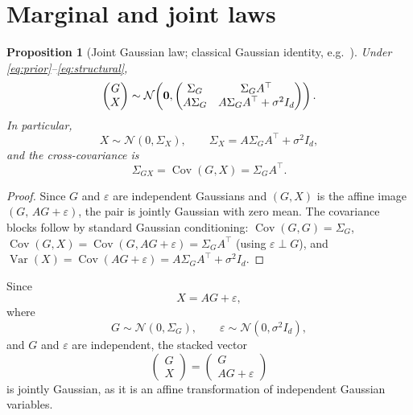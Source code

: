 \documentclass{article}
\newtheorem{proposition}{Proposition}
\newcommand{\N}{\mathcal{N}}
\newcommand{\Cov}{\operatorname{Cov}}
\newcommand{\Var}{\operatorname{Var}}
\newcommand{\Sg}{\Sigma_{G}}
\newcommand{\Sx}{\Sigma_{X}}
\newcommand{\Sgx}{\Sigma_{GX}}
\newcommand{\T}{^{\top}}
\begin{document}
\section{Marginal and joint laws}
\label{sec:joint}


\begin{proposition}[Joint Gaussian law; classical Gaussian identity, e.g.\ \citealp{cover2006elements}]
\label{prop:joint}
Under \eqref{eq:prior}--\eqref{eq:structural},
\begin{equation}
\begin{pmatrix}
G\\
X
\end{pmatrix}
\sim
\N\!\left(
\bf{0},
\begin{pmatrix}
\Sg & \Sg A^\top\\
A\Sg & A\Sg A^\top + \sigma^2 I_d
\end{pmatrix}
\right).
\end{equation}
In particular,
\begin{equation}
X \sim \N(0,\Sx),
\qquad
\Sx = A\Sg A^\top + \sigma^2 I_d,
\label{eq:sigmax}
\end{equation}
and the cross-covariance is
\begin{equation}
\Sgx = \Cov(G,X)=\Sg A^\top.
\end{equation}
\end{proposition}

\begin{proof}
Since $G$ and $\varepsilon$ are independent Gaussians and
$(G, X)$ is the affine image $(G,\,AG+\varepsilon)$, the pair is jointly
Gaussian with zero mean. The covariance blocks follow by standard Gaussian
conditioning: $\Cov(G,G)=\Sg$, $\Cov(G,X)=\Cov(G,AG+\varepsilon)=\Sg A\T$ (using
$\varepsilon\perp G$), and $\Var(X)=\Cov(AG+\varepsilon)=A\Sg A\T+\sigma^2 I_d$.
\end{proof}

\iffalse
Since
\[
X = AG + \varepsilon,
\]
where
\[
G \sim \N(0,\Sg),
\qquad
\varepsilon \sim \N(0,\sigma^2 I_d),
\]
and $G$ and $\varepsilon$ are independent, the stacked vector
\[
\begin{pmatrix}
G\\
X
\end{pmatrix}
=
\begin{pmatrix}
G\\
AG+\varepsilon
\end{pmatrix}
\]
is jointly Gaussian, as it is an affine transformation of independent Gaussian variables.
\end{document}
